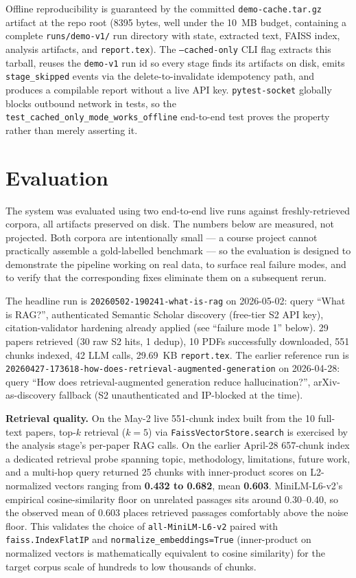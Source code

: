 \documentclass[12pt,a4paper]{article}
\begin{document}
Offline reproducibility is guaranteed by the committed \texttt{demo-cache.tar.gz}
artifact at the repo root (8395 bytes, well under the 10~MB budget, containing a
complete \texttt{runs/demo-v1/} run directory with state, extracted text, FAISS
index, analysis artifacts, and \texttt{report.tex}). The \texttt{--cached-only} CLI
flag extracts this tarball, reuses the \texttt{demo-v1} run id so every stage finds
its artifacts on disk, emits \texttt{stage\_skipped} events via the
delete-to-invalidate idempotency path, and produces a compilable report without a
live API key. \texttt{pytest-socket} globally blocks outbound network in tests, so
the \texttt{test\_cached\_only\_mode\_works\_offline} end-to-end test proves the
property rather than merely asserting it.

\section{Evaluation}\label{sec:eval}

The system was evaluated using two end-to-end live runs against
freshly-retrieved corpora, all artifacts preserved on disk. The numbers below
are measured, not projected. Both corpora are intentionally small --- a course
project cannot practically assemble a gold-labelled benchmark --- so the
evaluation is designed to demonstrate the pipeline working on real data, to
surface real failure modes, and to verify that the corresponding fixes
eliminate them on a subsequent rerun.

The headline run is \texttt{20260502-190241-what-is-rag} on 2026-05-02: query
``What is RAG?'', authenticated Semantic Scholar discovery (free-tier S2 API
key), citation-validator hardening already applied (see ``failure mode 1''
below). 29 papers retrieved (30 raw S2 hits, 1 dedup), 10 PDFs successfully
downloaded, 551 chunks indexed, 42 LLM calls, 29.69~KB \texttt{report.tex}.
The earlier reference run is
\texttt{20260427-173618-how-does-retrieval-augmented-generation} on 2026-04-28:
query ``How does retrieval-augmented generation reduce hallucination?'', arXiv-
as-discovery fallback (S2 unauthenticated and IP-blocked at the time).

\textbf{Retrieval quality.} On the May-2 live 551-chunk index built from the
10 full-text papers, top-$k$ retrieval ($k=5$) via
\texttt{FaissVectorStore.search} is exercised by the analysis stage's per-paper
RAG calls. On the earlier April-28 657-chunk index a dedicated retrieval probe
spanning topic, methodology, limitations, future work, and a multi-hop query
returned 25 chunks with inner-product scores on L2-normalized vectors ranging
from \textbf{0.432 to 0.682}, mean \textbf{0.603}. MiniLM-L6-v2's empirical
cosine-similarity floor on unrelated passages sits around 0.30--0.40, so the
observed mean of 0.603 places retrieved passages comfortably above the noise
floor. This validates the choice of \texttt{all-MiniLM-L6-v2} paired with
\texttt{faiss.IndexFlatIP} and \texttt{normalize\_embeddings=True}
(inner-product on normalized vectors is mathematically equivalent to cosine
similarity) for the target corpus scale of hundreds to low thousands of chunks.
\end{document}
